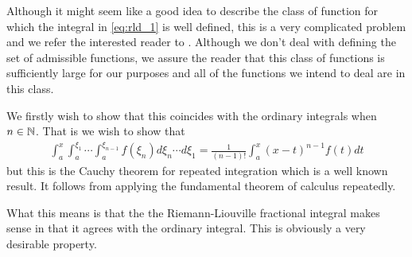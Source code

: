 Although it might seem like a good idea to describe the class of function for which the integral in \eqref{eq:rld_1} is well defined, this is a very complicated problem and we refer the interested reader to \cite{Samko1993}. Although we don't deal with defining the set of admissible functions, we assure the reader that this class of functions is sufficiently large for our purposes and all of the functions we intend to deal are in this class.

We firstly wish to show that this coincides with the ordinary integrals when $ n \in \mathbb{N} $. 
That is we wish to show that 
\begin{align*}
    \int_a^x \int_a^{\xi_1} \cdots \int_a^{\xi_{n-1}} f(\xi_n) d\xi_n\cdots d\xi_1 = \frac{1}{(n-1)!} \int_a^x (x-t)^{n-1}f(t)dt
\end{align*}
but this is the Cauchy theorem for repeated integration which is a well known result. It follows from applying the fundamental theorem of calculus repeatedly. 

What this means is that the the Riemann-Liouville fractional integral makes sense in that it agrees with the ordinary integral. This is obviously a very desirable property. 

